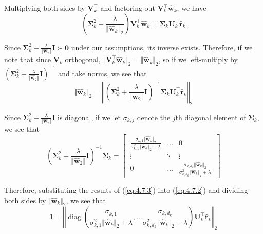 \documentclass{article}
\numberwithin{equation}{section}
\begin{document}
Multiplying both sides by $ \mathbf{V}_k^\top $ and factoring out
$ \mathbf{V}_k^\top\hat{\mathbf{w}}_k $, we have
\begin{equation*}
    \left(
        \mathbf{\Sigma}_k^2 + \frac{\lambda}{\Vert\hat{\mathbf{w}}_k\Vert_2}
    \right)
    \mathbf{V}_k^\top\hat{\mathbf{w}}_k =
    \mathbf{\Sigma}_k\mathbf{U}_k^\top\hat{\mathbf{r}}_k
\end{equation*}

Since $ \mathbf{\Sigma}_k^2 +
\frac{\lambda}{\Vert\hat{\mathbf{w}}_2\Vert}\mathbf{I} \succ \mathbf{0} $
under our assumptions, its inverse exists. Therefore, if we note that since
$ \mathbf{V}_k $ orthogonal,
$ \Vert\mathbf{V}_k^\top\hat{\mathbf{w}}_k\Vert_2 =
\Vert\hat{\mathbf{w}}_k\Vert_2 $, so if we left-multiply by
$ \left(\mathbf{\Sigma}_k^2 +
\frac{\lambda}{\Vert\hat{\mathbf{w}}_2\Vert}\mathbf{I}\right)^{-1} $ and take
norms, we see that
\begin{equation} \label{eq:4.7.2}
    \Vert\hat{\mathbf{w}}_k\Vert_2 =
    \left\Vert
        \left(
            \mathbf{\Sigma}_k^2 +
            \frac{\lambda}{\Vert\hat{\mathbf{w}}_2\Vert}\mathbf{I}
        \right)^{-1}
        \mathbf{\Sigma}_k\mathbf{U}_k^\top\hat{\mathbf{r}}_k
    \right\Vert_2
\end{equation}

Since $ \mathbf{\Sigma}_k^2 +
\frac{\lambda}{\Vert\hat{\mathbf{w}}_2\Vert}\mathbf{I} $ is diagonal, if we
let $ \sigma_{k, j} $ denote the $ j $th diagonal element of
$ \mathbf{\Sigma}_k $, we see that
\begin{equation} \label{eq:4.7.3}
    \left(
        \mathbf{\Sigma}_k^2 +
        \frac{\lambda}{\Vert\hat{\mathbf{w}}_2\Vert}\mathbf{I}
    \right)^{-1}
    \mathbf{\Sigma}_k =
    \begin{bmatrix}
        \ \frac{
            \sigma_{k, 1}\Vert\hat{\mathbf{w}}_k\Vert_2
        }{
            \sigma_{k, 1}^2\Vert\hat{\mathbf{w}}_k\Vert_2 + \lambda
        }
        & \ldots & 0
        \ \\
        \ \vdots & \ddots & \vdots \ \\
        \ 0 & \ldots &
        \frac{
            \sigma_{k, d_k}\Vert\hat{\mathbf{w}}_k\Vert_2
        }{
            \sigma_{k, d_k}^2\Vert\hat{\mathbf{w}}_k\Vert_2 + \lambda
        } \
    \end{bmatrix}
\end{equation}

Therefore, substituting the results of (\ref{eq:4.7.3}) into (\ref{eq:4.7.2})
and dividing both sides by $ \Vert\hat{\mathbf{w}}_k\Vert_2 $, we see that
\begin{equation} \label{eq:4.7.4}
    1 =
    \left\Vert
        \operatorname{diag}
        \left(
            \frac{
                \sigma_{k, 1}
            }{
                \sigma_{k, 1}^2\Vert\hat{\mathbf{w}}_k\Vert_2 + \lambda
            },
            \ldots \frac{
                \sigma_{k, d_k}
            }{
                \sigma_{k, d_k}^2\Vert\hat{\mathbf{w}}_k\Vert_2 + \lambda
            }
        \right)
        \mathbf{U}_k^\top\hat{\mathbf{r}}_k
    \right\Vert_2
\end{equation}
\end{document}
